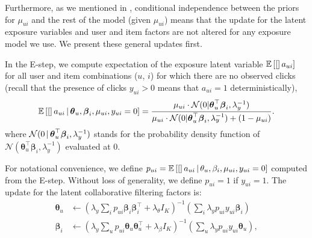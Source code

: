 Furthermore, as we mentioned in , conditional independence 
between the priors for $\mu_{ui}$ and the rest of the model (given $\mu_{ui}$) 
means that the update for the latent exposure variables and user and item factors are not altered for any exposure model we use. We present these general updates first.

In the E-step, we compute expectation of the exposure latent variable $\mathbb{E}\left[[\right]a_{ui}]$ for all user and item combinations ($u$, $i$) for which there are no observed clicks (recall that the presence of clicks $y_{ui}>0$ means that $a_{ui}=1$ deterministically),
\begin{equation}
\mathbb{E}\left[[\right]a_{ui} \,\vert\, \boldsymbol\theta_u, \boldsymbol\beta_i, \mu_{ui}, y_{ui} = 0] = \frac{\mu_{ui} \cdot \mathcal{N}(0 | \boldsymbol\theta_u^\top\boldsymbol\beta_i, \lambda_y^{-1})}{\mu_{ui}\cdot \mathcal{N}(0 |  \boldsymbol\theta_u^\top \boldsymbol\beta_i, \lambda_y^{-1}) + (1 - \mu_{ui})}.
\label{eq:update_a}
\end{equation}
where $\mathcal{N}(0 \,\vert\, \boldsymbol\theta_u^\top\boldsymbol\beta_i, \lambda_y^{-1})$ stands for the probability density function of $\mathcal{N}(\boldsymbol\theta_u^\top\boldsymbol\beta_i, \lambda_y^{-1})$ evaluated at $0$. 

For notational convenience, we define $p_{ui} = \mathbb{E}\left[[\right]a_{ui} \,\vert\, \theta_u, \beta_i, \mu_{ui}, y_{ui} = 0]$ computed from the E-step. Without loss of generality, we define $p_{ui} = 1$ if $y_{ui} = 1$. The update for the latent collaborative filtering factors is:
\begin{align}
\boldsymbol\theta_u &\leftarrow \textstyle(\lambda_y \sum_i p_{ui} \boldsymbol\beta_i \boldsymbol\beta_i^\top +  \lambda_\theta I_K)^{-1} (\sum_i \lambda_y p_{ui} y_{ui} \boldsymbol\beta_i ) \label{eq:update_theta}\\
\boldsymbol\beta_i &\leftarrow \textstyle(\lambda_y \sum_u p_{ui} \boldsymbol\theta_u \boldsymbol\theta_u^\top + \lambda_\beta I_K)^{-1} (\sum_u \lambda_y p_{ui} {y}_{ui} \boldsymbol\theta_u), \label{eq:update_beta}
\end{align}

